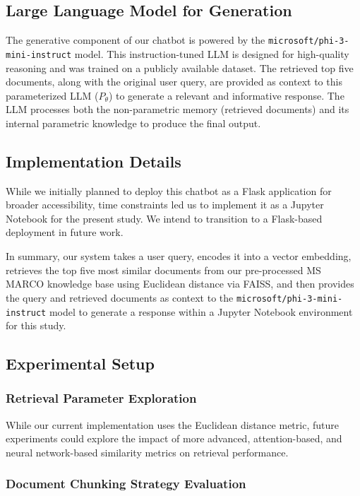 \documentclass{article}
\begin{document}
\subsection{Large Language Model for Generation}

The generative component of our chatbot is powered by the \texttt{microsoft/phi-3-mini-instruct}\cite{Microsoft_Phi} model. This instruction-tuned LLM is designed for high-quality reasoning and was trained on a publicly available dataset. The retrieved top five documents, along with the original user query, are provided as context to this parameterized LLM ($P_{\theta}$) to generate a relevant and informative response. The LLM processes both the non-parametric memory (retrieved documents) and its internal parametric knowledge to produce the final output.

\subsection{Implementation Details}
While we initially planned to deploy this chatbot as a Flask application for broader accessibility, time constraints led us to implement it as a Jupyter Notebook for the present study. We intend to transition to a Flask-based deployment in future work.

In summary, our system takes a user query, encodes it into a vector embedding, retrieves the top five most similar documents from our pre-processed MS MARCO \cite{MS_MARCO} knowledge base using Euclidean distance via FAISS\cite{faisslibrary}, and then provides the query and retrieved documents as context to the \texttt{microsoft/phi-3-mini-instruct}\cite{Microsoft_Phi} model to generate a response within a Jupyter Notebook environment for this study.

\subsection{Experimental Setup}

\subsubsection{Retrieval Parameter Exploration}

While our current implementation uses the Euclidean distance metric, future experiments could explore the impact of more advanced, attention-based, and neural network-based similarity metrics on retrieval performance.

\subsubsection{Document Chunking Strategy Evaluation}
\end{document}
